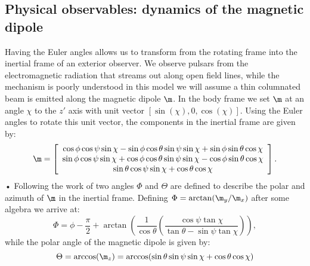 \documentclass[/home/greg/Thesis/main/main.tex]{subfiles}
\begin{document}
\subsection{Physical observables: dynamics of the magnetic dipole}
Having the Euler angles allows us to transform from the rotating frame into the inertial frame of an exterior observer. We observe pulsars from the electromagnetic radiation that streams out along open field lines, while the mechanism is poorly understood in this model we will assume a thin columnated beam is emitted along the magnetic dipole $\m$. %
In the body frame we set $\m$ at an angle $\chi$ to the $z'$ axis with unit vector $[\sin(\chi), 0, \cos(\chi)]$. Using the Euler angles to rotate this unit vector, the components in the inertial frame are given by:
\begin{equation}
\m = 
\left[\begin{array}{c}
\cos\phi\cos\psi\sin\chi - \sin\phi \cos \theta \sin \psi \sin \chi + \sin \phi \sin \theta \cos \chi \\
\sin\phi\cos\psi\sin\chi + \cos\phi \cos \theta \sin \psi \sin \chi - \cos \phi \sin \theta \cos \chi \\
\sin\theta \cos\psi \sin\chi + \cos\theta \cos \chi
\end{array}\right].
\label{eqn:m inertial}
\end{equation}•
Following the work of \citet{Jones2001} two angles $\Phi$ and $\Theta$ are defined to describe the polar and azimuth of $\m$ in the inertial frame. 
Defining $\Phi = \arctan(\m_{y} / \m_{x})$ after some algebra we arrive at: 
\begin{equation}
\Phi = \phi - \frac{\pi}{2} + \arctan\left(\frac{1}{\cos\theta}\left(\frac{\cos\psi \tan \chi}{\tan\theta - \sin \psi \tan\chi }\right)\right),
\label{eqn:Phi}
\end{equation}
while the polar angle of the magnetic dipole is given by:
\begin{equation}
\Theta = \arccos(\m_{z}) = \arccos(\sin \theta \sin \psi \sin \chi + \cos \theta \cos \chi )
\label{eqn:Theta}
\end{equation}
\end{document}
